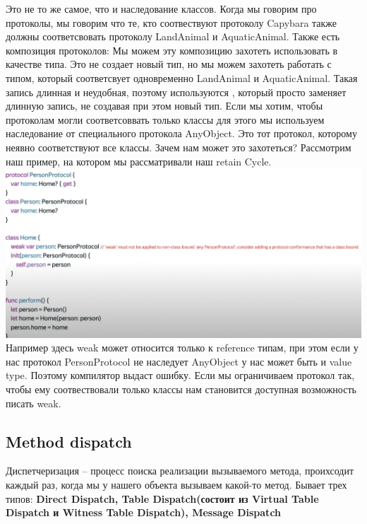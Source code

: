 \documentclass{article}
\begin{document}
    \newline
    Это не то же самое, что и наследование классов. Когда мы говорим про протоколы, мы говорим что те, кто соотвествуют протоколу Capybara также должны соответсвовать протоколу LandAnimal и AquaticAnimal.
    \newline
    Также есть композиция протоколов: 
    \newline
    Мы можем эту композицию захотеть использовать в качестве типа. Это не создает новый тип, но мы можем захотеть работать с типом, который соответсвует одновременно LandAnimal и AquaticAnimal. Такая запись длинная и неудобная, поэтому используются , который просто заменяет длинную запись, не создавая при этом новый тип. 
    \newline
    Если мы хотим, чтобы протоколам могли соответсоввать только классы для этого мы используем наследование от специального протокола AnyObject. Это тот протокол, которому неявно соответствуют все классы. 
    \newline
    Зачем нам может это захотеться? Рассмотрим наш пример, на котором мы рассматривали наш retain Cycle. 
    \newline
    \includegraphics[scale = 0.5]{pic/Снимок экрана 2023-07-28 в 00.00.15.png}
    \newline
    Например здесь weak может относится только к reference типам, при этом если у нас протокол PersonProtocol не наследует AnyObject у нас может быть и value type. Поэтому компилятор выдаст ошибку. 
    \newline
    Если мы ограничиваем протокол так, чтобы ему соотвествовали только классы нам становится доступная возможность писать weak.
    \subsection{Method dispatch}
    Диспетчеризация -- процесс поиска реализации вызываемого метода, проихсодит каждый раз, когда мы у нашего объекта вызываем какой-то метод. Бывает трех типов: \textbf{Direct Dispatch, Table Dispatch(состоит из Virtual Table Dispatch и Witness Table Dispatch), Message Dispatch}
\end{document}
